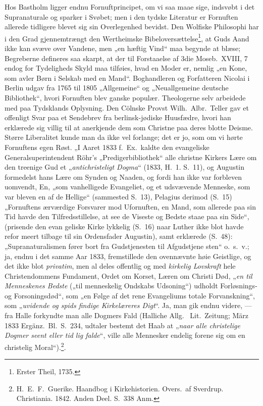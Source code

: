 \documentclass[12pt,a4paper]{article}
\newcommand{\opage}[1]{\marginnote{\footnotesize\textit{[#1]}}}
\begin{document}
Hos Bastholm ligger endnu Fornuftprincipet, om vi saa maae
sige, indsvøbt i det Supranaturale og sparker i Svøbet; men i
\opage{30}den tydske Literatur er Fornuften allerede tidligere blevet sig sin
Overlegenhed bevidst. Den Wolfiske Philosophi har i den Grad
gjennemtrængt den Wertheimske Bibeloversættelse\footnote{Erster Theil, 1735.}, %
at Guds Aand
ikke kan svæve over Vandene, men „en hæftig Vind“ maa begynde
at blæse; Begreberne defineres saa skarpt, at der til Forstaaelse
af 3die Moseb.\ XVIII, 7 endog for Tydeligheds Skyld maa tilføies,
hvad en Moder er, nemlig „en Kone, som avler Børn i Selskab
med en Mand“. Boghandleren og Forfatteren Nicolai i Berlin
udgav fra 1765 til 1805 „Allgemeine“ og „Neuallgemeine deutsche
Bibliothek“, hvori Fornuften blev ganske populær. Theologerne
selv arbeidede med paa Tydsklands Oplysning. Den Cölnske Provst
Wilh.\ Albr.\ Teller gav et offenligt Svar paa et Sendebrev fra
berlinsk-jødiske Huusfædre, hvori han erklærede sig villig til at
anerkjende dem som Christne paa deres blotte Deisme. Større
Liberalitet kunde man da ikke vel forlange; det er jo, som om vi
hørte Fornuftens egen Røst. „I Aaret 1833 f.\ Ex.\ kaldte den
evangeliske Generalsuperintendent Röhr's „Predigerbibliothek“ alle
christne Kirkers Lære om den treenige Gud et „\emph{antichristeligt
Dogma}“ (1833, H.\ 1. S.\ 11), og Augustin formedelst hans Lære
om Synden og Naaden, og fordi han ikke var forbleven uomvendt,
En, „som vanhelligede Evangeliet, og et udsvævende Menneske,
som var bleven en af de Hellige“ (sammested S.\ 13), Pelagius
derimod (S.\ 15) „Fornuftens ærværdige Forsvarer mod Ufornuften,
en Mand, som allerede paa sin Tid havde den Tilfredsstillelse, at
see de Viseste og Bedste staae paa sin Side“, (prisende den evan\-%
geliske Kirke lykkelig (S.\ 16) naar Luther ikke blot havde refor\-%
meert tilbage til sin Ordensfader Augustin), samt erklærede (S.\ 48):
„Supranaturalismen fører bort fra Gudstjenesten til Afgudstjene\-%
sten“ o.\ s.\ v.; ja, endnu i det samme Aar 1833, fremstillede den
ovennævnte høie Geistlige, og det ikke blot \emph{privatim}, men al\-%
deles offentlig og med \emph{kirkelig Lovskraft} hele Christendommens
Fundament, Ordet om Korset, Læren om Christi Død, „\emph{en til
Menneskenes Bedste} („til menneskelig Ondskabs Udsoning“)
\opage{31}udholdt Forløsnings- og Forsoningsdød“, som „en Følge af det rene
Evangeliums totale Forvanskning“, som „\emph{uvidende og spids\-%
findige Kirkelæreres Digt}“. Ja, man gik endnu videre,
--- fra Halle forkyndte man alle Dogmers Fald (Halliche Allg.\ %
Lit.\ Zeitung; März 1833 Ergänz.\ Bl.\ S.\ 234, udtaler bestemt det
Haab at „\emph{naar alle christelige Dogmer seent eller tid\-%
lig falde}“, ville alle Mennesker endelig forene sig om en christelig
Moral“).\footnote{H.\ E.\ F.\ Guerike. Haandbog i Kirkehistorien. Overs.\ af Sverdrup.
Christiania. 1842. Anden Deel. S.\ 338 Anm.}. %
\end{document}
